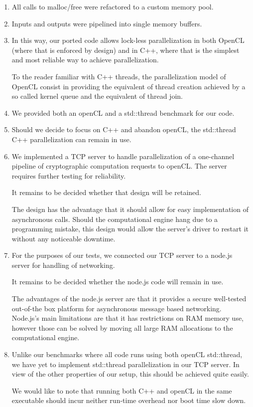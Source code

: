 \documentclass{article}
\begin{document}
\begin{enumerate}
\item All calls to malloc/free were refactored to a custom memory pool. 
\item Inputs and outputs were pipelined into single memory buffers. 
\item In this way, our ported code allows lock-less parallelization in both OpenCL (where that is enforced by design) and in C++, where that is the simplest and most reliable way to achieve parallelization. 

To the reader familiar with C++ threads, the parallelization model of OpenCL consist in providing the equivalent of thread creation achieved by a so called kernel queue and the equivalent of thread join.

\item We provided both an openCL and a std::thread benchmark for our code.

\item Should we decide to focus on C++ and abandon openCL, the std::thread C++ parallelization can remain in use. 

\item We implemented a TCP server to handle parallelization of a one-channel pipeline of cryptographic computation requests to openCL. The server requires further testing for reliability.  

It remains to be decided whether that design will be retained. 

The design has the advantage that it should allow for easy implementation of asynchronous calls. Should the computational engine hang due to a programming mistake, this design would allow the server's driver to restart it without any noticeable downtime.

\item For the purposes of our tests, we connected our TCP server to a node.js server for handling of networking. 

It remains to be decided whether the node.js code will remain in use. 

The advantages of the node.js server are that it provides a secure well-tested out-of-the box platform for asynchronous message based networking. Node.js's main limitations are that it has restrictions on RAM memory use, however those can be solved by moving all large RAM allocations to the computational engine.

\item Unlike our benchmarks where all code runs using both openCL std::thread, we have yet to implement std::thread parallelization in our TCP server. In view of the other properties of our setup, this should be achieved quite easily. 

We would like to note that running both C++ and openCL in the same executable should incur neither run-time overhead nor boot time slow down.


 
\end{enumerate}
\end{document}
